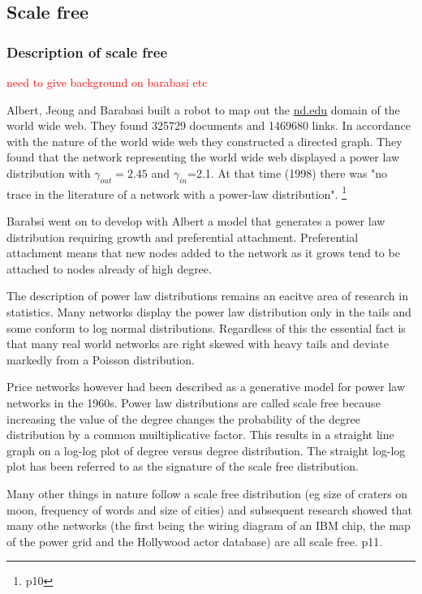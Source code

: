 \subsection{Scale free}
\label{sec:scale_free}
\subsubsection{Description of scale free}

\textcolor{red}{need to give background on barabasi etc}

Albert, Jeong and Barabasi \cite{albert1999diameter} built a robot  to map out the \url{nd.edu} domain of the world wide web. They found 325729 documents and 1469680 links. In accordance with the nature of the world wide web they constructed a directed graph. They found that the network representing the world wide web displayed a power law distribution with $\gamma_{out}=2.45$ and $\gamma_{in}$=2.1. At that time (1998) there was "no trace in the literature of a network with a power-law distribution". \cite{barabasi2016network}\footnote{p10}

Barabsi went on to develop with Albert a model that generates a power law distribution requiring growth and preferential attachment. Preferential attachment means that new nodes added to the network as it grows tend to be attached to nodes already of high degree.

The description of power law distributions remains an eacitve area of research in statistics. Many networks display the power law distribution only in the tails and some conform to log normal distributions. Regardless of this the essential fact is that many real world networks are right skewed with heavy tails and deviate markedly from a Poisson distribution. 

Price networks however had been described as a generative model for power law networks in the 1960s. Power law distributions are called scale free because increasing the value of the degree changes the probability of the degree distribution by a common muiltiplicative factor. This results in a straight line graph on a log-log plot of degree versus degree distribution. The straight log-log plot has been referred to as the signature of the scale free distribution. 

Many other things in nature follow a scale free distribution (eg size of craters on moon, frequency of words and size of cities) and subsequent research showed that many othe networks (the first being the wiring diagram of an IBM chip, the map of the power grid and the Hollywood actor database) are all scale free.\cite{barabasi2016network} p11.

